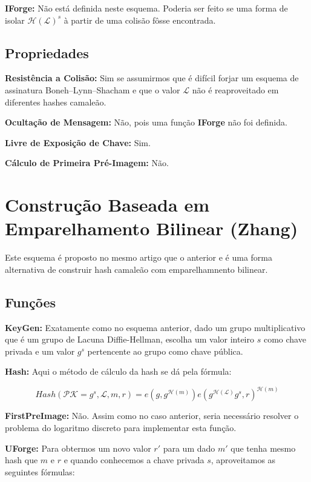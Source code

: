 \documentclass[a4paper]{article}
\begin{document}
\textbf{IForge:} Não está definida neste esquema. Poderia ser feito se
uma forma de isolar $\mathcal{H}(\mathcal{L})^s$ à partir de uma
colisão fôsse encontrada.

\subsection{Propriedades}

\textbf{Resistência a Colisão: }Sim se assumirmos que é difícil forjar
um esquema de assinatura Boneh–Lynn–Shacham e que o valor
$\mathcal{L}$ não é reaproveitado em diferentes hashes camaleão.

\textbf{Ocultação de Mensagem: }Não, pois uma função \textbf{IForge}
não foi definida.

\textbf{Livre de Exposição de Chave: } Sim.

\textbf{Cálculo de Primeira Pré-Imagem: }Não.

\section{Construção Baseada em Emparelhamento Bilinear (Zhang) \cite{zhang}}

Este esquema é proposto no mesmo artigo que o anterior e é uma forma
alternativa de construir hash camaleão com emparelhamnento bilinear.

\subsection{Funções}

\textbf{KeyGen: }Exatamente como no esquema anterior, dado um grupo
multiplicativo que é um grupo de Lacuna Diffie-Hellman, escolha um
valor inteiro $s$ como chave privada e um valor $g^s$ pertencente ao
grupo como chave pública.

\textbf{Hash: } Aqui o método de cálculo da hash se dá pela fórmula:

$$
Hash(\mathcal{PK}=g^s, \mathcal{L}, m, r) = e(g, g^{\mathcal{H}(m)})e(g^{\mathcal{H}(\mathcal{L})}g^s, r)^{\mathcal{H}(m)}
$$

\textbf{FirstPreImage:} Não. Assim como no caso anterior, seria
necessário resolver o problema do logaritmo discreto para implementar
esta função.

\textbf{UForge:} Para obtermos um novo valor $r'$ para um dado $m'$
que tenha mesmo hash que $m$ e $r$ e quando conhecemos a chave privada
$s$, aproveitamos as seguintes fórmulas:
\end{document}
